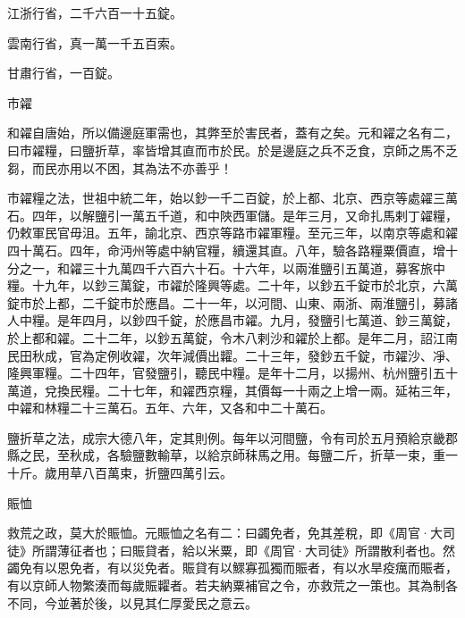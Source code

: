 \begin{pinyinscope}
 江浙行省，二千六百一十五錠。



 雲南行省，真一萬一千五百索。



 甘肅行省，一百錠。



 市糴



 和糴自唐始，所以備邊庭軍需也，其弊至於害民者，蓋有之矣。元和糴之名有二，曰市糴糧，曰鹽折草，率皆增其直而市於民。於是邊庭之兵不乏食，京師之馬不乏芻，而民亦用以不困，其為法不亦善乎！



 市糴糧之法，世祖中統二年，始以鈔一千二百錠，於上都、北京、西京等處糴三萬石。四年，以解鹽引一萬五千道，和中陜西軍儲。是年三月，又命扎馬剌丁糴糧，仍敕軍民官毋沮。五年，諭北京、西京等路市糴軍糧。至元三年，以南京等處和糴四十萬石。四年，命沔州等處中納官糧，續還其直。八年，驗各路糧粟價直，增十分之一，和糴三十九萬四千六百六十石。十六年，以兩淮鹽引五萬道，募客旅中糧。十九年，以鈔三萬錠，市糴於隆興等處。二十年，以鈔五千錠市於北京，六萬錠市於上都，二千錠市於應昌。二十一年，以河間、山東、兩浙、兩淮鹽引，募諸人中糧。是年四月，以鈔四千錠，於應昌市糴。九月，發鹽引七萬道、鈔三萬錠，於上都和糴。二十二年，以鈔五萬錠，令木八剌沙和糴於上都。是年二月，詔江南民田秋成，官為定例收糴，次年減價出糶。二十三年，發鈔五千錠，市糴沙、凈、隆興軍糧。二十四年，官發鹽引，聽民中糧。是年十二月，以揚州、杭州鹽引五十萬道，兌換民糧。二十七年，和糴西京糧，其價每一十兩之上增一兩。延祐三年，中糴和林糧二十三萬石。五年、六年，又各和中二十萬石。



 鹽折草之法，成宗大德八年，定其則例。每年以河間鹽，令有司於五月預給京畿郡縣之民，至秋成，各驗鹽數輸草，以給京師秣馬之用。每鹽二斤，折草一束，重一十斤。歲用草八百萬束，折鹽四萬引云。



 賑恤



 救荒之政，莫大於賑恤。元賑恤之名有二：曰蠲免者，免其差稅，即《周官·大司徒》所謂薄征者也；曰賑貸者，給以米粟，即《周官·大司徒》所謂散利者也。然蠲免有以恩免者，有以災免者。賑貸有以鰥寡孤獨而賑者，有以水旱疫癘而賑者，有以京師人物繁湊而每歲賑糶者。若夫納粟補官之令，亦救荒之一策也。其為制各不同，今並著於後，以見其仁厚愛民之意云。




\end{pinyinscope}
